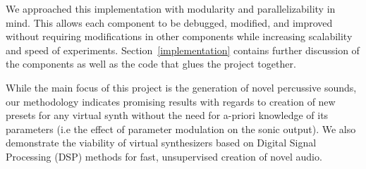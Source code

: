\documentclass[\main/thesis.tex]{subfiles}
\begin{document}
We approached this implementation with modularity and parallelizability in mind. This allows each component to be debugged, modified, and improved without requiring modifications in other components while increasing scalability and speed of experiments. 
Section~\ref{implementation} contains further discussion of the components as well as the code that glues the project together.

While the main focus of this project is the generation of novel percussive sounds, our methodology indicates promising results with regards to creation of new presets for any virtual synth without the need for a-priori knowledge of its parameters (i.e the effect of parameter modulation on the sonic output). We also demonstrate the viability of virtual synthesizers based on Digital Signal Processing (DSP) methods for fast, unsupervised creation of novel audio. 


\end{document}
